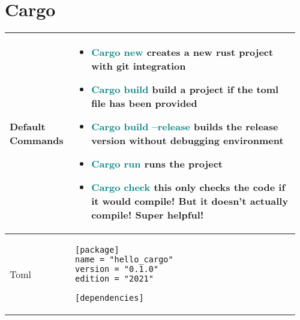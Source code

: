 \documentclass[main.tex,fontsize=8pt,paper=a4,paper=portrait,DIV=calc,]{scrartcl}
\begin{document}
\begin{table}[h!]
\section{Cargo}
\begin{tabular}{|m{0.2\linewidth}|m{0.755\linewidth}|}
\hline
Default Commands &
\vspace{2mm}
\begin{itemize}
  \item \textcolor{teal}{Cargo new} creates a new rust project with git integration
  \item \textcolor{teal}{Cargo build} build a project if the toml file has been provided
  \item \textcolor{teal}{Cargo build --release} builds the release version without debugging environment
  \item \textcolor{teal}{Cargo run} runs the project
  \item \textcolor{teal}{Cargo check} this only checks the code if it would compile! But it doesn't actually compile! Super helpful!
  \vspace{-3mm}
\end{itemize}\\
\hline
Toml & 
\begin{lstlisting}
[package]
name = "hello_cargo"
version = "0.1.0"
edition = "2021"

[dependencies]
\end{lstlisting}
\\
\hline
\end{tabular}

\end{table}
\end{document}
